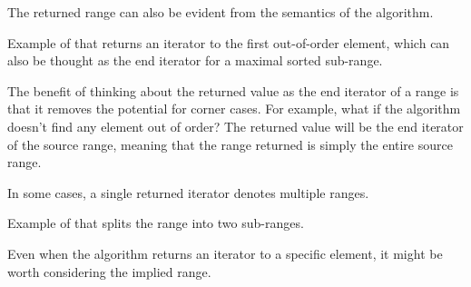 The returned range can also be evident from the semantics of the algorithm.

\begin{box-note}
\footnotesize Example of  that returns an iterator to the first out-of-order element, which can also be thought as the end iterator for a maximal sorted sub-range.
\tcblower
{}
\end{box-note}

The benefit of thinking about the returned value as the end iterator of a range is that it removes the potential for corner cases. For example, what if the algorithm doesn't find any element out of order? The returned value will be the end iterator of the source range, meaning that the range returned is simply the entire source range.

In some cases, a single returned iterator denotes multiple ranges.

\begin{box-note}
\footnotesize Example of  that splits the range into two sub-ranges.
\tcblower
{}
\end{box-note}

Even when the algorithm returns an iterator to a specific element, it might be worth considering the implied range.

